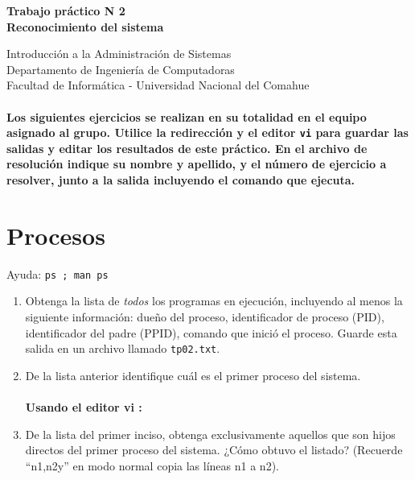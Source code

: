 \documentclass[12pt]{article}
\def\maketitle{

 \makeatletter
 {\color{bl} \centering \huge \sc \textbf{
Trabajo práctico N 2 \\
\large \vspace*{-8pt} \color{black} Reconocimiento del sistema
 \vspace*{8pt} }\par}
 \makeatother


 \makeatletter
 {\centering \small 
	Introducción a la Administración de Sistemas \\
 	Departamento de Ingeniería de Computadoras \\
 	Facultad de Informática - Universidad Nacional del Comahue \\
 	\vspace{20pt} }
 \makeatother

}
\begin{document}
\thispagestyle{empty}
\maketitle
\setlength{\parindent}{0pt}

\paragraph{Los siguientes ejercicios se realizan en su totalidad en el equipo asignado al grupo.
Utilice la redirección y el editor \texttt{vi} para guardar las salidas y editar los resultados de este práctico. En el archivo de resolución indique su nombre y apellido, y el número de ejercicio a resolver, junto a la salida incluyendo el comando que ejecuta. }



\section*{Procesos}
Ayuda: \texttt{ps ; man ps}
\begin{enumerate}
\item Obtenga la lista de \textit{todos} los programas en ejecución, incluyendo al menos la siguiente información:
dueño del proceso, identificador de proceso (PID), identificador del padre (PPID),
comando que inició el proceso. Guarde esta salida en un archivo llamado \texttt{tp02.txt}.
\item De la lista anterior identifique cuál es el primer proceso del sistema. \\ \\
\textbf{Usando el editor vi :} 
\item De la lista del primer inciso, obtenga exclusivamente aquellos que son hijos directos del primer proceso del sistema. ¿Cómo obtuvo el listado? (Recuerde ``n1,n2y'' en modo normal copia las líneas n1 a n2).
\end{enumerate}
\end{document}
